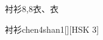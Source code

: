 \begin{entry}{衬衫}{8,8}{⾐、⾐}
  \begin{phonetics}{衬衫}{chen4shan1}[][HSK 3]
  \end{phonetics}
\end{entry}
